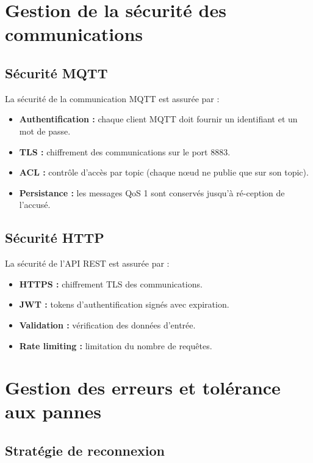 \section{Gestion de la s\'ecurit\'e des communications}

\subsection{S\'ecurit\'e MQTT}

La s\'ecurit\'e de la communication MQTT est assur\'ee par :

\begin{itemize}
    \item \textbf{Authentification :} chaque client MQTT doit fournir un identifiant et un mot de passe.
    \item \textbf{TLS :} chiffrement des communications sur le port 8883.
    \item \textbf{ACL :} contr\^ole d'acc\`es par topic (chaque n\oe{}ud ne publie que sur son topic).
    \item \textbf{Persistance :} les messages QoS 1 sont conserv\'es jusqu'\`a r\'e-ception de l'accus\'e.
\end{itemize}

\subsection{S\'ecurit\'e HTTP}

La s\'ecurit\'e de l'API REST est assur\'ee par :

\begin{itemize}
    \item \textbf{HTTPS :} chiffrement TLS des communications.
    \item \textbf{JWT :} tokens d'authentification sign\'es avec expiration.
    \item \textbf{Validation :} v\'erification des donn\'ees d'entr\'ee.
    \item \textbf{Rate limiting :} limitation du nombre de requ\^etes.
\end{itemize}

\section{Gestion des erreurs et tol\'erance aux pannes}

\subsection{Strat\'egie de reconnexion}

